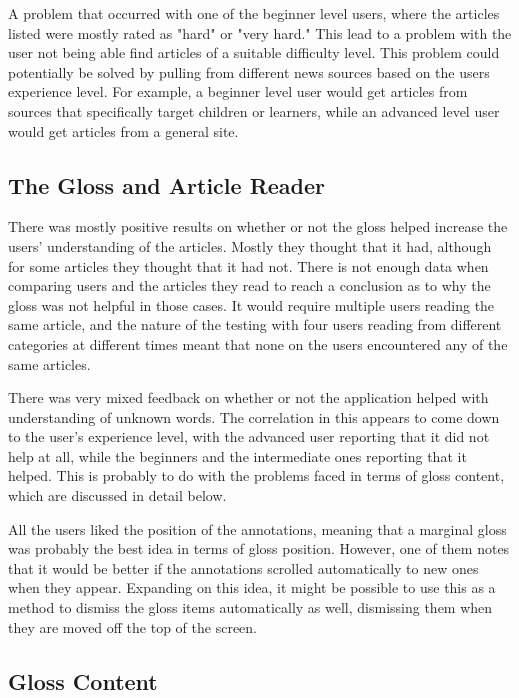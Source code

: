 A problem that occurred with one of the beginner level users, where the articles listed were mostly rated as "hard" or "very hard." This lead to a problem with the user not being able find articles of a suitable difficulty level. This problem could potentially be solved by pulling from different news sources based on the users experience level. For example, a beginner level user would get articles from sources that specifically target children or learners, while an advanced level user would get articles from a general site.

\subsection{The Gloss and Article Reader}

There was mostly positive results on whether or not the gloss helped increase the users' understanding of the articles. Mostly they thought that it had, although for some articles they thought that it had not. There is not enough data when comparing users and the articles they read to reach a conclusion as to why the gloss was not helpful in those cases. It would require multiple users reading the same article, and the nature of the testing with four users reading from different categories at different times meant that none on the users encountered any of the same articles. 

There was very mixed feedback on whether or not the application helped with understanding of unknown words. The correlation in this appears to come down to the user's experience level, with the advanced user reporting that it did not help at all, while the beginners and the intermediate ones reporting that it helped. This is probably to do with the problems faced in terms of gloss content, which are discussed in detail below.

All the users liked the position of the annotations, meaning that a marginal gloss was probably the best idea in terms of gloss position. However, one of them notes that it would be better if the annotations scrolled automatically to new ones when they appear. Expanding on this idea, it might be possible to use this as a method to dismiss the gloss items automatically as well, dismissing them when they are moved off the top of the screen.

\subsection{Gloss Content}


